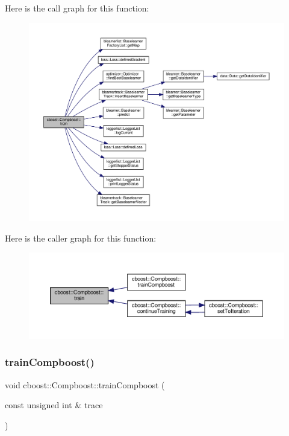 Here is the call graph for this function\+:
\nopagebreak
\begin{figure}[H]
\begin{center}
\leavevmode
\includegraphics[width=350pt]{classcboost_1_1_compboost_a5d0ec331d3a75a19b89c54b67e64acad_cgraph}
\end{center}
\end{figure}
Here is the caller graph for this function\+:
\nopagebreak
\begin{figure}[H]
\begin{center}
\leavevmode
\includegraphics[width=350pt]{classcboost_1_1_compboost_a5d0ec331d3a75a19b89c54b67e64acad_icgraph}
\end{center}
\end{figure}
\mbox{\label{classcboost_1_1_compboost_a3689a0d4517ec30905ef5ae46b1cb9c9}} 
\subsubsection{\texorpdfstring{train\+Compboost()}{trainCompboost()}}
{\footnotesize\ttfamily void cboost\+::\+Compboost\+::train\+Compboost (\begin{DoxyParamCaption}\item[{const unsigned int \&}]{trace }\end{DoxyParamCaption})}

